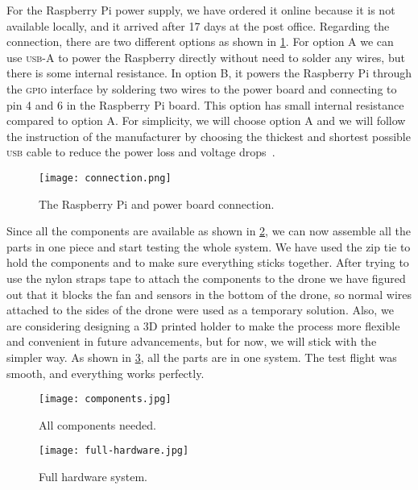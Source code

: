 \documentclass[../main.tex]{subfiles}
\begin{document}
For the Raspberry Pi power supply, we have ordered it 
online because it is not available locally, and 
it arrived after 17 days at the post office.
Regarding the connection, there are 
two different options as shown in \cref{fig:connection}.
For option A we can use \textsc{usb}-A to power the Raspberry directly without
need to solder any wires,
but there is some internal resistance.
In option B, it powers the Raspberry Pi through the \textsc{gpio} 
interface by soldering two wires to the power board and 
connecting to pin 4 and 6 in the Raspberry Pi board.
This option has small internal resistance compared to option A.
For simplicity, we will choose option A and we will 
follow the instruction of the manufacturer by choosing 
the thickest and shortest possible \textsc{usb} cable to reduce 
the power loss and voltage drops~\cite{makerfocus}.

 \begin{figure}[p]
 	\centering
 	\texttt{[image: connection.png]}
 	\caption{The Raspberry Pi and power board connection.}
 	\label{fig:connection}
 \end{figure}   

Since all the components are available as shown 
in \cref{fig:components}, we can now assemble 
all the parts in one piece and start testing the whole system.
We have used the zip tie to hold the components and to
make sure everything sticks together. After trying to use the 
nylon straps tape to attach the components to the drone 
we have figured out that it blocks the fan 
and sensors in the bottom of the drone, 
so normal wires attached to the sides of the drone were 
used as a temporary solution. Also, we are considering 
designing a 3D printed holder to make the process more 
flexible and convenient in future advancements, but for now,
we will stick with the simpler way. As shown in 
\cref{fig:full-hardware}, all the parts are in one system. 
The test flight was smooth, and everything works perfectly. 

 \begin{figure}[p]
	\centering
	\texttt{[image: components.jpg]}
	\caption{All components needed.}
	\label{fig:components}
\end{figure}

  \begin{figure}[p]
 	\centering
 	\texttt{[image: full-hardware.jpg]}
 	\caption{Full hardware system.}
 	\label{fig:full-hardware}
 \end{figure}  
\end{document}
